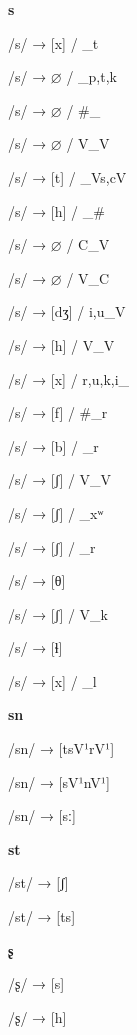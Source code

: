 \begin{center}\textbf{s}\end{center}
\begin{multicols}{4}
\noindent /s/ → [x] / \_t

\noindent /s/ → $\varnothing$ / \_{p,t,k}

\noindent /s/ → $\varnothing$ / \#\_

\noindent /s/ → $\varnothing$ / V\_V

\noindent /s/ → [t] / \_V{s,c}V

\noindent /s/ → [h] / \_\#

\noindent /s/ → $\varnothing$ / C\_V

\noindent /s/ → $\varnothing$ / V\_C

\noindent /s/ → [dʒ] / {i,u}\_V

\noindent /s/ → [h] / V\_V

\noindent /s/ → [x] / {r,u,k,i}\_

\noindent /s/ → [f] / \#\_r

\noindent /s/ → [b] / \_r

\noindent /s/ → [ʃ] / V\_V

\noindent /s/ → [ʃ] / \_xʷ

\noindent /s/ → [ʃ] / \_r

\noindent /s/ → [θ]

\noindent /s/ → [ʃ] / V\_k

\noindent /s/ → [ɬ]

\noindent /s/ → [x] / \_l

\end{multicols}

\begin{center}\textbf{sn}\end{center}
\begin{multicols}{4}
\noindent /sn/ → [tsV¹rV¹]

\noindent /sn/ → [sV¹nV¹]

\noindent /sn/ → [sː]

\end{multicols}

\begin{center}\textbf{st}\end{center}
\begin{multicols}{4}
\noindent /st/ → [ʃ]

\noindent /st/ → [ts]

\end{multicols}

\begin{center}\textbf{ʂ}\end{center}
\begin{multicols}{4}
\noindent /ʂ/ → [s]

\noindent /ʂ/ → [h]

\end{multicols}


